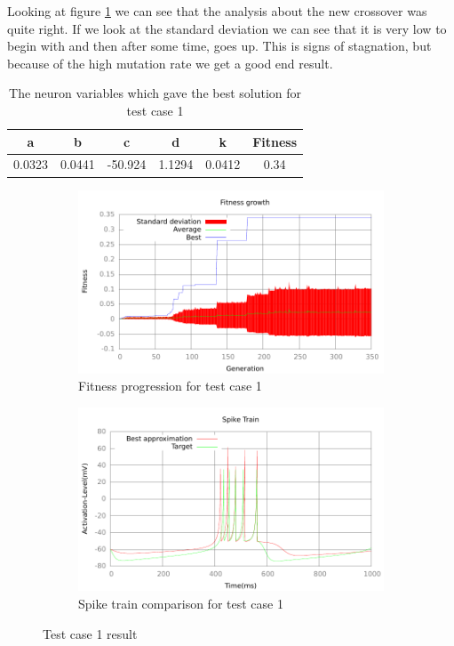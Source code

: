 Looking at figure \ref{fig:fitness-test-case-1} we can see that the analysis
about the new crossover was quite right. If we look at the standard deviation we
can see that it is very low to begin with and then after some time, goes up. This
is signs of stagnation, but because of the high mutation rate we get a good end
result.
\begin{table}[h]
	\begin{tabular}{c c c c c c}
		a & b & c & d & k & Fitness\\
		\hline
		0.0323 & 0.0441 & -50.924 & 1.1294 & 0.0412 & 0.34
	\end{tabular}
	\caption{The neuron variables which gave the best solution for test case
	1}
\end{table}
\begin{figure}[h]
	\centering
	\begin{subfigure}[b]{0.5\textwidth}
		\includegraphics[width=\textwidth]{../output/stdm_izzy_1_fitness.pdf}
		\caption{Fitness progression for test case 1}
		\label{fig:fitness-test-case-1}
	\end{subfigure}%
	\begin{subfigure}[b]{0.5\textwidth}
		\includegraphics[width=\textwidth]{../output/stdm_izzy_1_spike.pdf}
		\caption{Spike train comparison for test case 1}
		\label{fig:spike-test-case-1}
	\end{subfigure}
	\caption{Test case 1 result}
\end{figure}

